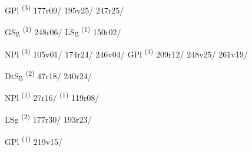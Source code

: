 \noindent{} \LEMMALINE
\begin{description}
    \item[] GPl \textsuperscript{(3)} \mbox{177r09/} \mbox{195v25/} \mbox{247r25/}
\end{description}
\ENTRYEND

\noindent{} \LEMMALINE
\begin{description}
    \item[] GSg \textsuperscript{(1)} \mbox{248r06/} \CASEBREAK LSg \textsuperscript{(1)} \mbox{150r02/}
    \item[] NPl \textsuperscript{(3)} \mbox{105v01/} \mbox{174r24/} \mbox{246v04/} \CASEBREAK GPl \textsuperscript{(3)} \mbox{209r12/} \mbox{248v25/} \mbox{261v19/}
\end{description}
\ENTRYEND

\noindent{} \LEMMALINE
\begin{description}
    \item[] DtSg \textsuperscript{(2)} \mbox{47r18/} \mbox{240r24/}
\end{description}
\ENTRYEND

\noindent{} \LEMMALINE
\begin{description}
    \item[] NPl \textsuperscript{(1)} \mbox{27r16/} \textsuperscript{(1)} \mbox{119r08/}
\end{description}
\ENTRYEND

\noindent{} \LEMMALINE
\begin{description}
    \item[] LSg \textsuperscript{(2)} \mbox{177r30/} \mbox{193r23/}
\end{description}
\ENTRYEND

\noindent{} \LEMMALINE
\begin{description}
    \item[] GPl \textsuperscript{(1)} \mbox{219v15/}
\end{description}
\ENTRYEND

